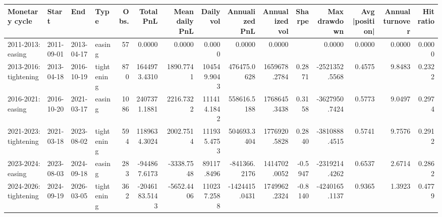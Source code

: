 \begin{tabular}{llllrrrrrrrrrrr}
\toprule
Monetary cycle & Start & End & Type & Obs. & Total PnL & Mean daily PnL & Daily vol & Annualized PnL & Annualized vol & Sharpe & Max drawdown & Avg |position| & Annual turnover & Hit ratio \\
\midrule
2011-2013: easing & 2011-09-01 & 2013-04-17 & easing & 57 & 0.0000 & 0.0000 & 0.0000 & 0.0000 & 0.0000 &  & 0.0000 & 0.0000 & 0.0000 & 0.0000 \\
2013-2016: tightening & 2013-04-18 & 2016-10-19 & tightening & 870 & 1644973.4310 & 1890.7741 & 104549.9043 & 476475.0628 & 1659678.2784 & 0.2871 & -2521352.5568 & 0.4575 & 9.8483 & 0.2322 \\
2016-2021: easing & 2016-10-20 & 2021-03-17 & easing & 1086 & 2407371.1881 & 2216.7322 & 111414.1842 & 558616.5188 & 1768645.3438 & 0.3158 & -3627950.7424 & 0.5773 & 9.0497 & 0.2974 \\
2021-2023: tightening & 2021-03-18 & 2023-08-02 & tightening & 594 & 1189634.3024 & 2002.7514 & 111935.4753 & 504693.3404 & 1776920.5828 & 0.2840 & -3810888.4515 & 0.5741 & 9.7576 & 0.2912 \\
2023-2024: easing & 2023-08-03 & 2024-09-18 & easing & 283 & -944867.6173 & -3338.7548 & 89117.8496 & -841366.2176 & 1414702.0052 & -0.5947 & -2319214.4262 & 0.6537 & 2.6714 & 0.2862 \\
2024-2026: tightening & 2024-09-19 & 2026-03-05 & tightening & 362 & -2046183.5143 & -5652.4406 & 110237.2588 & -1424415.0431 & 1749962.2324 & -0.8140 & -4240165.1137 & 0.9365 & 1.3923 & 0.4779 \\
\bottomrule
\end{tabular}

